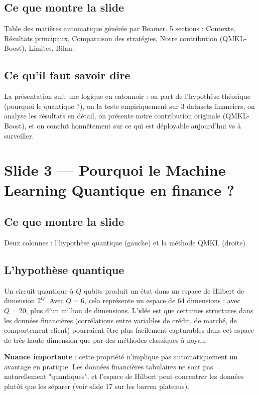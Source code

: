 \documentclass[12pt, a4paper]{article}
\begin{document}
\subsection*{Ce que montre la slide}

Table des matières automatique générée par Beamer.
5 sections : Contexte, Résultats principaux, Comparaison des stratégies,
Notre contribution (QMKL-Boost), Limites, Bilan.

\subsection*{Ce qu'il faut savoir dire}

La présentation suit une logique en entonnoir :
on part de l'hypothèse théorique (pourquoi le quantique ?),
on la teste empiriquement sur 3 datasets financiers,
on analyse les résultats en détail, on présente notre contribution originale (QMKL-Boost),
et on conclut honnêtement sur ce qui est déployable aujourd'hui vs à surveiller.

\section{Slide 3 — Pourquoi le Machine Learning Quantique en finance ?}

\subsection*{Ce que montre la slide}

Deux colonnes : l'hypothèse quantique (gauche) et la méthode QMKL (droite).

\subsection*{L'hypothèse quantique}

Un circuit quantique à $Q$ qubits produit un état dans un espace de Hilbert
de dimension $2^Q$. Avec $Q=6$, cela représente un espace de $64$ dimensions ;
avec $Q=20$, plus d'un million de dimensions.
L'idée est que certaines structures dans les données financières
(corrélations entre variables de crédit, de marché, de comportement client)
pourraient être plus facilement capturables dans cet espace de très haute dimension
que par des méthodes classiques à noyau.

\textbf{Nuance importante} : cette propriété n'implique pas automatiquement
un avantage en pratique. Les données financières tabulaires ne sont pas
naturellement "quantiques", et l'espace de Hilbert peut concentrer
les données plutôt que les séparer (voir slide 17 sur les barren plateaus).
\end{document}
